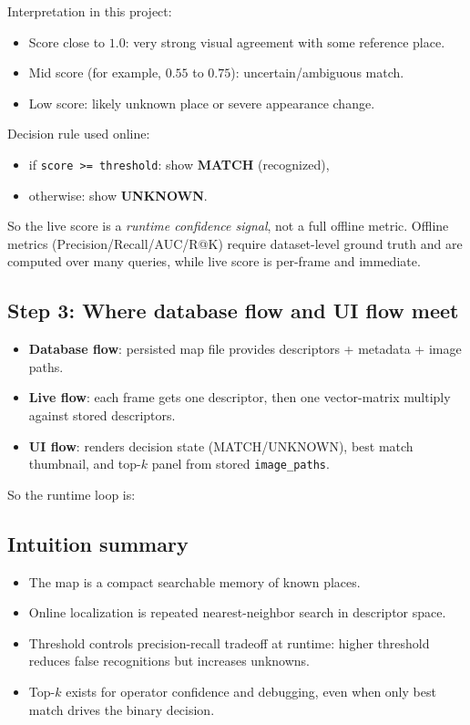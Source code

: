 \documentclass[11pt]{article}
\begin{document}
Interpretation in this project:
\begin{itemize}[leftmargin=*]
  \item Score close to $1.0$: very strong visual agreement with some reference place.
  \item Mid score (for example, $0.55$ to $0.75$): uncertain/ambiguous match.
  \item Low score: likely unknown place or severe appearance change.
\end{itemize}

Decision rule used online:
\begin{itemize}[leftmargin=*]
  \item if \texttt{score >= threshold}: show \textbf{MATCH} (recognized),
  \item otherwise: show \textbf{UNKNOWN}.
\end{itemize}

So the live score is a \emph{runtime confidence signal}, not a full offline metric. Offline metrics (Precision/Recall/AUC/R@K) require dataset-level ground truth and are computed over many queries, while live score is per-frame and immediate.

\subsection{Step 3: Where database flow and UI flow meet}
\begin{itemize}[leftmargin=*]
  \item \textbf{Database flow}: persisted map file provides descriptors + metadata + image paths.
  \item \textbf{Live flow}: each frame gets one descriptor, then one vector-matrix multiply against stored descriptors.
  \item \textbf{UI flow}: renders decision state (MATCH/UNKNOWN), best match thumbnail, and top-$k$ panel from stored \texttt{image\_paths}.
\end{itemize}

So the runtime loop is:
\begin{center}
\end{center}

\subsection{Intuition summary}
\begin{itemize}[leftmargin=*]
  \item The map is a compact searchable memory of known places.
  \item Online localization is repeated nearest-neighbor search in descriptor space.
  \item Threshold controls precision-recall tradeoff at runtime: higher threshold reduces false recognitions but increases unknowns.
  \item Top-$k$ exists for operator confidence and debugging, even when only best match drives the binary decision.
\end{itemize}
\end{document}
